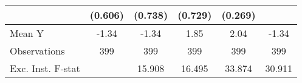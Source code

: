 {\begin{tabular}{l*{5}{c}}
            &     (0.606)         &     (0.738)         &     (0.729)         &     (0.269)         &                     \\
\midrule
Mean Y      &       -1.34         &       -1.34         &        1.85         &        2.04         &       -1.34         \\
Observations&         399         &         399         &         399         &         399         &         399         \\
Exc. Inst. F-stat&                     &      15.908         &      16.495         &      33.874         &      30.911         \\
\bottomrule
\end{tabular}
}
